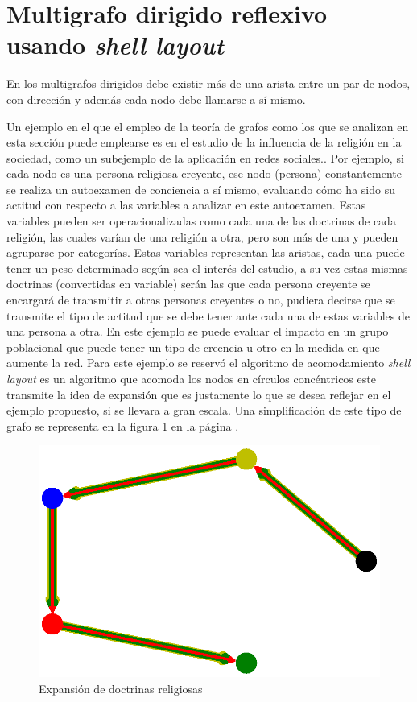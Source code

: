 \documentclass{article}
\begin{document}
\section{Multigrafo dirigido reflexivo usando \textit{shell layout} } 

En los multigrafos dirigidos debe existir más de una arista entre un par de nodos, con dirección y además cada nodo debe llamarse a sí mismo.

Un ejemplo en el que el empleo de la teoría de grafos como los que se analizan en esta sección puede emplearse es en el estudio de la influencia de la religión en la sociedad, como un subejemplo de la aplicación en redes sociales.\cite{redes}. 
Por ejemplo, si cada nodo es una persona religiosa creyente, ese nodo (persona) constantemente se realiza un autoexamen de conciencia a sí mismo, evaluando cómo ha sido su actitud con respecto a las variables a analizar en este autoexamen. Estas variables pueden ser operacionalizadas como cada una de las doctrinas de cada religión, las cuales varían de una religión a otra, pero son más de una y pueden agruparse por categorías. Estas variables representan las aristas, cada una puede tener un peso determinado según sea el interés del estudio, a su vez estas mismas doctrinas (convertidas en variable) serán las que cada persona creyente se encargará de transmitir a otras personas creyentes o no, pudiera decirse que se transmite el tipo de actitud que se debe tener ante cada una de estas variables de una persona a otra. En este ejemplo se puede evaluar el impacto en un grupo poblacional que puede tener un tipo de creencia u otro en la medida en que aumente la red. Para este ejemplo se reservó el algoritmo de acomodamiento \textit{shell layout} es un algoritmo que acomoda los nodos en círculos concéntricos \cite{layout} este transmite la idea de expansión que es justamente lo que se desea reflejar en el ejemplo propuesto, si se llevara a gran escala. Una simplificación de este tipo de grafo se representa en la figura \ref{fig:Fig12} en la página \pageref{fig:Fig12}.
\newpage


\newpage
\begin{figure}[htbp]
    \centering
    \includegraphics[scale=0.6]{imagenes1/Fig12.eps}
    \caption{Expansión de doctrinas religiosas}
    \label{fig:Fig12}
\end{figure}

\newpage


\end{document}
